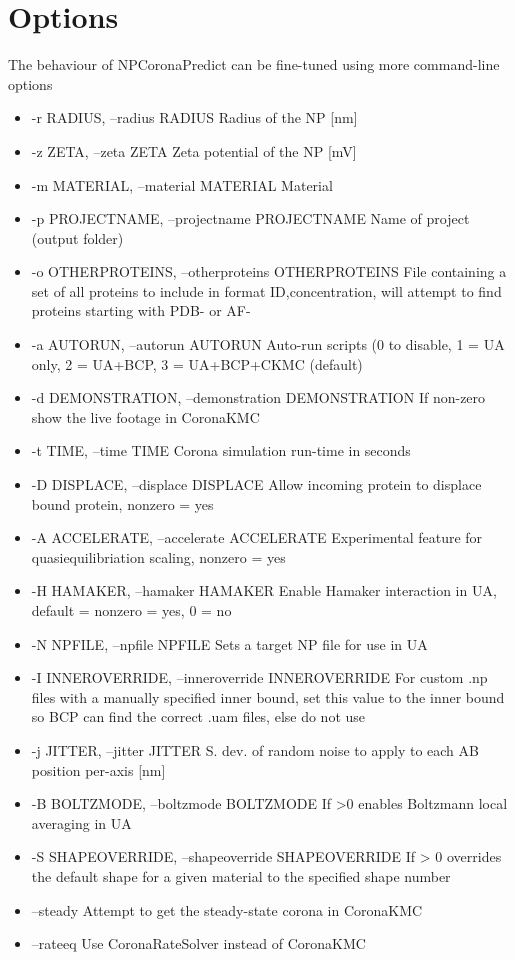 \documentclass[10pt,a4paper,onecolumn]{report}
\begin{document}
\section{Options}
The behaviour of NPCoronaPredict can be fine-tuned using more command-line options
\begin{itemize}
\item  -r RADIUS, --radius RADIUS                        Radius of the NP [nm]
\item  -z ZETA, --zeta ZETA  Zeta potential of the NP [mV]
\item  -m MATERIAL, --material MATERIAL                        Material
\item  -p PROJECTNAME, --projectname PROJECTNAME Name of project (output folder)
\item  -o OTHERPROTEINS, --otherproteins OTHERPROTEINS                        File containing a set of all proteins to include in format ID,concentration, will attempt to find proteins starting with PDB- or AF-
\item  -a AUTORUN, --autorun AUTORUN                        Auto-run scripts (0 to disable, 1 = UA only, 2 = UA+BCP, 3 = UA+BCP+CKMC (default)
\item  -d DEMONSTRATION, --demonstration DEMONSTRATION                        If non-zero show the live footage in CoronaKMC
\item  -t TIME, --time TIME  Corona simulation run-time in seconds
\item  -D DISPLACE, --displace DISPLACE                        Allow incoming protein to displace bound protein, nonzero = yes
\item  -A ACCELERATE, --accelerate ACCELERATE                        Experimental feature for quasiequilibriation scaling, nonzero = yes
\item  -H HAMAKER, --hamaker HAMAKER                        Enable Hamaker interaction in UA, default = nonzero = yes, 0 = no
\item  -N NPFILE, --npfile NPFILE                        Sets a target NP file for use in UA
\item  -I INNEROVERRIDE, --inneroverride INNEROVERRIDE                        For custom .np files with a manually specified inner bound, set this value to the inner bound so BCP can find the correct .uam files, else do not use
\item  -j JITTER, --jitter JITTER                        S. dev. of random noise to apply to each AB position per-axis [nm]
\item  -B BOLTZMODE, --boltzmode BOLTZMODE                        If >0 enables Boltzmann local averaging in UA
\item  -S SHAPEOVERRIDE, --shapeoverride SHAPEOVERRIDE                        If > 0 overrides the default shape for a given material to the specified shape number
\item  --steady              Attempt to get the steady-state corona in CoronaKMC
\item --rateeq               Use CoronaRateSolver instead of CoronaKMC
\end{itemize}
\end{document}
